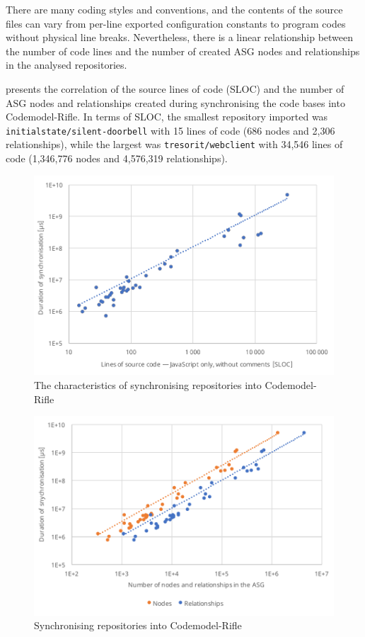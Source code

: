 There are many coding styles and conventions, and the contents of the source files can vary from per-line exported configuration constants to program codes without physical line breaks. Nevertheless, there is a linear relationship between the number of code lines and the number of created ASG nodes and relationships in the analysed repositories.

 presents the correlation of the source lines of code (SLOC) and the number of ASG nodes and relationships created during synchronising the code bases into Codemodel-Rifle. In terms of SLOC, the smallest repository imported was \lstinline{initialstate/silent-doorbell} with 15 lines of code (686 nodes and 2,306 relationships), while the largest was \lstinline{tresorit/webclient} with 34,546 lines of code (1,346,776 nodes and 4,576,319 relationships).


\begin{figure}[!htb]
	\centerfloat
	\includegraphics[width=\textwidth,clip]{figures/measurement-synctime-sloc.pdf}
	\caption{The characteristics of synchronising repositories into Codemodel-Rifle}
	\label{fig:measurement-synctime-sloc}
\end{figure}

\begin{figure}[!htb]
	\centerfloat
	\includegraphics[width=\textwidth,clip]{figures/measurement-synctime-nodes-relationships.pdf}
	\caption{Synchronising repositories into Codemodel-Rifle}
	\label{fig:measurement-synctime-nodes-relationships}
\end{figure}

